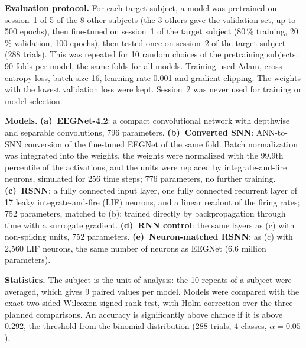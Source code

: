 \documentclass[10pt,letterpaper]{article}
\newcommand{\head}[1]{\textbf{#1.}}
\begin{document}
\head{Evaluation protocol} For each target subject, a model was pretrained on session~1 of 5 of the 8 other subjects
(the 3 others gave the validation set, up to 500 epochs), then fine-tuned on session~1 of the target subject
(80\,\% training, 20\,\% validation, 100 epochs), then tested once on session~2 of the target subject (288 trials). This
was repeated for 10 random choices of the pretraining subjects: 90 folds per model, the same folds for all models.
Training used Adam, cross-entropy loss, batch size 16, learning rate 0.001 and gradient clipping. The weights
with the lowest validation loss were kept. Session~2 was never used for training or model selection.

\head{Models} \textbf{(a)~EEGNet-4,2}: a compact convolutional network with depthwise and separable
convolutions, 796 parameters. \textbf{(b)~Converted SNN}: ANN-to-SNN conversion of the fine-tuned EEGNet of the same
fold. Batch normalization was integrated into the weights, the weights were normalized with the 99.9th percentile of
the activations, and the units were replaced by integrate-and-fire neurons, simulated for 256 time steps; 776
parameters, no further training. \textbf{(c)~RSNN}: a fully connected input layer, one fully connected recurrent layer
of 17 leaky integrate-and-fire (LIF) neurons, and a linear readout of the firing rates; 752 parameters, matched
to (b); trained directly by backpropagation through time with a surrogate gradient. \textbf{(d)~RNN control}: the same
layers as (c) with non-spiking units, 752 parameters. \textbf{(e)~Neuron-matched RSNN}: as (c) with 2,560 LIF
neurons, the same number of neurons as EEGNet (6.6 million parameters).

\head{Statistics} The subject is the unit of analysis: the 10 repeats of a subject were averaged, which gives 9 paired
values per model. Models were compared with the exact two-sided Wilcoxon signed-rank test, with Holm correction over the
three planned comparisons. An accuracy is significantly above chance if it is above 0.292, the threshold from the
binomial distribution (288 trials, 4 classes, $\alpha = 0.05$).
\end{document}
